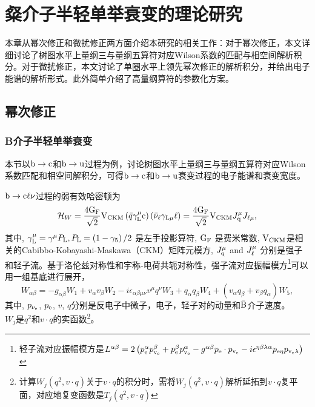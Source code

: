 \chapter{粲介子半轻单举衰变的理论研究}
本章从幂次修正和微扰修正两方面介绍本研究的相关工作：对于幂次修正，本文详细讨论了树图水平上量纲三与量纲五算符对应Wilson系数的匹配与相空间解析积分。对于微扰修正，本文讨论了单圈水平上领先幂次修正的解析积分，并给出电子能谱的解析形式。此外简单介绍了高量纲算符的参数化方案。
\section{幂次修正}
\subsection{B介子半轻单举衰变}
本节以$\mathrm{b \to c}$和$\mathrm{b \to u}$过程为例，讨论树图水平上量纲三与量纲五算符对应Wilson系数匹配和相空间解积分，可得$\mathrm{b\to c}$和$\mathrm{b\to u}$衰变过程的电子能谱和衰变宽度。

$\mathrm{b \rightarrow c \ell \nu}$过程的弱有效哈密顿为
\begin{equation}
    \mathcal{H}_W=\frac{4 \mathrm{G_F}}{\sqrt{2}} \mathrm{V}_{\mathrm{CKM}}\left(\bar{q} \gamma_{\mathrm{L}}^\mu\mathrm{c}\right)\left(\bar{\nu}_{\ell} \gamma_{\mathrm{L} \mu} \ell\right)=\mathrm{\frac{4 G_F}{\sqrt{2}} V_{\mathrm{CKM}} }J_{\mathrm{q}}^\mu J_{\mathrm{\ell} \mu},
    \end{equation}
其中, $\gamma_{\mathrm{L}}^\mu=\gamma^\mu P_{\mathrm{L}}, P_{\mathrm{L}}=\left(1-\gamma_5\right) / 2$ 是左手投影算符, $\mathrm{G_F}$ 是费米常数, $\mathrm{V}_{\mathrm{CKM}}$是相关的Cabibbo-Kobayashi-Maskawa（CKM）矩阵元模方, $J_{\mathrm{q}}^\mu$ and $J_{\mathrm{\ell}}^\mu$ 分别是强子和轻子流。基于洛伦兹对称性和宇称-电荷共轭对称性，强子流对应振幅模方\footnote{轻子流对应振幅模方是$ L^{\alpha \beta}=2\left(p_{\mathrm{e}}^\alpha p_{\mathrm{v_e}}^\beta+p_{\mathrm{e}}^\beta p_{\mathrm{v_e}}^\alpha-g^{\alpha \beta} p_{\mathrm{e}} \cdot p_{\mathrm{v_e}}-i \epsilon^{\eta \beta \lambda \alpha} p_{\mathrm{e} \eta} p_{\mathrm{v_e} \lambda}\right)$}可以用一组基底进行展开，
\begin{equation}
        W_{\alpha \beta}=-g_{\alpha \beta} W_1+v_\alpha v_\beta W_2-i \epsilon_{\alpha \beta \mu \nu} v^\mu q^\nu W_3+q_\alpha q_\beta W_4+\left(v_\alpha q_\beta+v_\beta q_\alpha\right) W_5,
\end{equation}
其中, $p_{\mathrm{\nu_{e}}}$, $p_{\mathrm{e}}$, $v$, $q$分别是反电子中微子，电子，轻子对的动量和$\mathrm{\bar{B}}$介子速度。 $W_{j}\text{是}q^{2}\text{和}v\cdot q$的实函数\footnote{计算$W_{j}(q^{2},v\cdot q)$关于$v\cdot q$的积分时，需将$W_{j}(q^{2},v\cdot q)$解析延拓到$v\cdot q$复平面，对应地复变函数是$T_{j}(q^{2},v\cdot q)$}。

